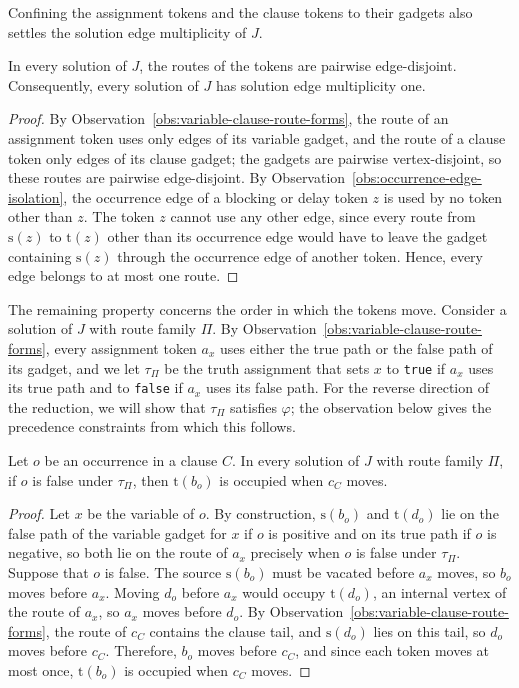 \documentclass[a4paper,USenglish,thm-restate]{lipics-v2021}
\newcommand{\src}{\mathrm{s}}
\newcommand{\tgt}{\mathrm{t}}
\theoremstyle{problemstyle}
\begin{document}
Confining the assignment tokens and the clause tokens to their gadgets also
settles the solution edge multiplicity of $J$.

\begin{observation}\label{obs:edge-disjoint-routes}
In every solution of $J$, the routes of the tokens are pairwise
edge-disjoint. Consequently, every solution of $J$ has solution edge
multiplicity one.
\end{observation}

\begin{proof}
By Observation~\ref{obs:variable-clause-route-forms}, the route of an assignment
token uses only edges of its variable gadget, and the route of a clause token
only edges of its clause gadget; the gadgets are pairwise vertex-disjoint, so
these routes are pairwise edge-disjoint. By
Observation~\ref{obs:occurrence-edge-isolation}, the occurrence edge of a
blocking or delay token $z$ is used by no token other than $z$. The token $z$
cannot use any other edge, since every route from $\src(z)$ to $\tgt(z)$ other
than its occurrence edge would have to leave the gadget containing $\src(z)$
through the occurrence edge of another token. Hence, every edge belongs to at
most one route.
\end{proof}

The remaining property concerns the order in which the tokens move. Consider
a solution of $J$ with route family $\Pi$. By
Observation~\ref{obs:variable-clause-route-forms}, every assignment token
$a_x$ uses either the true path or the false path of its gadget, and we let
$\tau_\Pi$ be the truth assignment that sets $x$ to \texttt{true} if $a_x$
uses its true path and to \texttt{false} if $a_x$ uses its false path. For
the reverse direction of the reduction, we will show that $\tau_\Pi$
satisfies $\varphi$; the observation below gives the precedence constraints
from which this follows.

\begin{observation}\label{obs:forced-literal-order}
Let $o$ be an occurrence in a clause $C$. In every solution of $J$ with
route family $\Pi$, if $o$ is false under $\tau_\Pi$, then $\tgt(b_o)$ is
occupied when $c_C$ moves.
\end{observation}

\begin{proof}
Let $x$ be the variable of $o$. By construction, $\src(b_o)$ and $\tgt(d_o)$
lie on the false path of the variable gadget for $x$ if $o$ is positive and
on its true path if $o$ is negative, so both lie on the route of $a_x$
precisely when $o$ is false under $\tau_\Pi$. Suppose that $o$ is false. The
source $\src(b_o)$ must be vacated before $a_x$ moves, so $b_o$ moves before
$a_x$. Moving $d_o$ before $a_x$ would occupy $\tgt(d_o)$, an internal
vertex of the route of $a_x$, so $a_x$ moves before $d_o$. By
Observation~\ref{obs:variable-clause-route-forms}, the route of $c_C$
contains the clause tail, and $\src(d_o)$ lies on this tail, so $d_o$ moves
before $c_C$. Therefore, $b_o$ moves before $c_C$, and since each token moves
at most once, $\tgt(b_o)$ is occupied when $c_C$ moves.
\end{proof}
\end{document}
